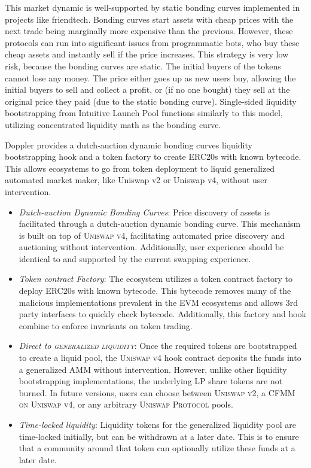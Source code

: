 \documentclass[sigconf,nonacm,prologue,table]{acmart}
\numberwithin{equation}{section}
\theoremstyle{definition}
\theoremstyle{remark}
\begin{document}
This market dynamic is well-supported by static bonding curves implemented in projects like friendtech. Bonding curves start assets with cheap prices with the next trade being marginally more expensive than the previous. However, these protocols can run into significant issues from programmatic bots, who buy these cheap assets and instantly sell if the price increases. This strategy is very low risk, because the bonding curves are static. The initial buyers of the tokens cannot lose any money. The price either goes up as new users buy, allowing the initial buyers to sell and collect a profit, or (if no one bought) they sell at the original price they paid (due to the static bonding curve). Single-sided liquidity bootstrapping from Intuitive Launch Pool functions similarly to this model, utilizing concentrated liquidity math as the bonding curve.

Doppler provides a dutch-auction dynamic bonding curves liquidity bootstrapping hook and a token factory to create ERC20s with known bytecode. This allows ecosystems to go from token deployment to liquid generalized automated market maker, like Uniswap v2 or Uniswap v4, without user intervention. 

\begin{itemize}
    \item \emph{Dutch-auction Dynamic Bonding Curves}: Price discovery of assets is facilitated through a dutch-auction dynamic bonding curve. This mechanism is built on top of \textsc{Uniswap v4}, facilitating automated price discovery and auctioning without intervention. Additionally, user experience should be identical to and supported by the current swapping experience. 
    \item \emph{Token contract Factory}: The ecosystem utilizes a token contract factory to deploy ERC20s with known bytecode. This bytecode removes many of the malicious implementations prevalent in the EVM ecosystems and allows 3rd party interfaces to quickly check bytecode. Additionally, this factory and hook combine to enforce invariants on token trading.
    \item \emph{Direct to \textsc{generalized liquidity}}: Once the required tokens are bootstrapped to create a liquid pool, the \textsc{Uniswap v4} hook contract deposits the funds into a generalized AMM without intervention. However, unlike other liquidity bootstrapping implementations, the underlying LP share tokens are not burned. In future versions, users can choose between \textsc{Uniswap v2}, a \textsc{CFMM on Uniswap v4}, or any arbitrary \textsc{Uniswap Protocol} pools.
    \item \emph{Time-locked liquidity}: Liquidity tokens for the generalized liquidity pool are time-locked initially, but can be withdrawn at a later date. This is to ensure that a community around that token can optionally utilize these funds at a later date.
\end{itemize}
\end{document}
